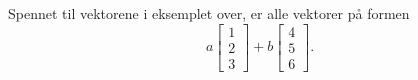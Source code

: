 \begin{ex}
	\noindent Spennet til vektorene i eksemplet over, er alle vektorer på formen
	\begin{equation*}
	a\begin{bmatrix}1 \\  2 \\ 3 \end{bmatrix}+ b\begin{bmatrix}4 \\  5 \\ 6 \end{bmatrix}.
	\end{equation*}
\end{ex}


